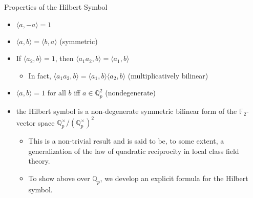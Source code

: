 \documentclass[fontset=fandol,envcountsect]{ctexbeamer}
\providecommand{\tightlist}{%
  \setlength{\itemsep}{0pt}\setlength{\parskip}{0pt}}\usepackage{longtable,booktabs,array}
\theoremstyle{theorem}
\theoremstyle{example}
\theoremstyle{remark}
\theoremstyle{theorem}
\theoremstyle{example}
\theoremstyle{remark}
\begin{document}
\begin{frame}{Properties of the Hilbert Symbol}
\label{properties-of-the-hilbert-symbol}
\begin{itemize}
\item
  \(\langle a, -a \rangle = 1\)
\item
  \(\langle a, b \rangle = \langle b, a \rangle\) (symmetric)
\item
  If \(\langle a_2,b \rangle = 1\), then
  \(\langle a_1 a_2, b \rangle = \langle a_1,b \rangle\)

  \begin{itemize}
  \tightlist
  \item
    In fact,
    \(\langle a_1 a_2, b \rangle = \langle a_1, b \rangle \langle a_2, b \rangle\)
    (multiplicatively bilinear)
  \end{itemize}
\item
  \(\langle a, b \rangle = 1\) for all \(b\) iff \(a \in \mathbb Q_p^2\)
  (nondegenerate)
\item
  the Hilbert symbol is a non-degenerate symmetric bilinear form of the
  \(\mathbb F_2\)-vector space
  \(\mathbb Q_p^\times / (\mathbb Q_p^\times)^2\)

  \begin{itemize}
  \item
    This is a non-trivial result and is said to be, to some extent, a
    generalization of the law of quadratic reciprocity in local class
    field theory.
  \item
    To show above over \(\mathbb Q_p\), we develop an explicit formula
    for the Hilbert symbol.
  \end{itemize}
\end{itemize}
\end{frame}
\end{document}
